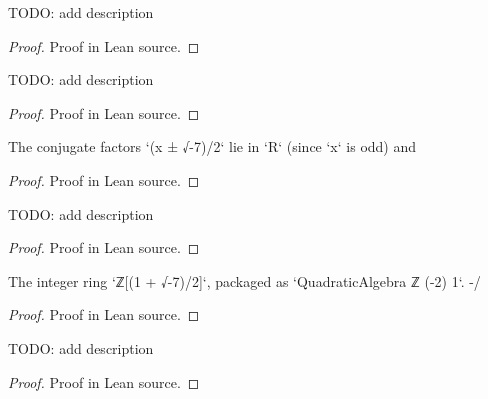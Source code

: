 \begin{lemma}
  \label{lem:associated_of_theta_pow_dvd}
  \leanok
  TODO: add description
\end{lemma}
\begin{proof}\leanok
  Proof in Lean source.
\end{proof}

\begin{lemma}
  \label{lem:associated_of_theta_pow_dvd_right}
  \leanok
  TODO: add description
\end{lemma}
\begin{proof}\leanok
  Proof in Lean source.
\end{proof}

\begin{lemma}
  \label{lem:factor_not_unit_left}
  \leanok
  The conjugate factors `(x ± √-7)/2` lie in `R` (since `x` is odd) and
\end{lemma}
\begin{proof}\leanok
  Proof in Lean source.
\end{proof}

\begin{lemma}
  \label{lem:factor_not_unit_right}
  \leanok
  TODO: add description
\end{lemma}
\begin{proof}\leanok
  Proof in Lean source.
\end{proof}

\begin{lemma}
  \label{lem:four_norm_eq}
  \leanok
  The integer ring `ℤ[(1 + √-7)/2]`, packaged as `QuadraticAlgebra ℤ (-2) 1`. -/
\end{lemma}
\begin{proof}\leanok
  Proof in Lean source.
\end{proof}

\begin{lemma}
  \label{lem:norm_pos}
  \leanok
  TODO: add description
\end{lemma}
\begin{proof}\leanok
  Proof in Lean source.
\end{proof}

